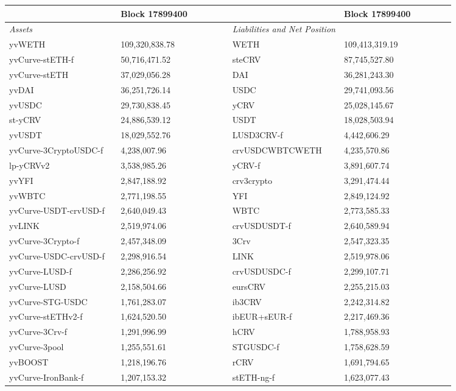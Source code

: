 
\begin{longtable}{@{}p{0.25\linewidth}p{0.25\linewidth}p{0.25\linewidth}p{0.25\linewidth}@{}}

\toprule


& Block 17899400 & & Block 17899400 \\

\midrule
\textit{Assets} & & \textit{Liabilities and Net Position} \\
yvWETH & 109,320,838.78 & WETH &109,413,319.19 \\
yvCurve-stETH-f & 50,716,471.52 & steCRV &87,745,527.80 \\
yvCurve-stETH & 37,029,056.28 & DAI &36,281,243.30 \\
yvDAI & 36,251,726.14 & USDC &29,741,093.56 \\
yvUSDC & 29,730,838.45 & yCRV &25,028,145.67 \\
st-yCRV & 24,886,539.12 & USDT &18,028,503.94 \\
yvUSDT & 18,029,552.76 & LUSD3CRV-f &4,442,606.29 \\
yvCurve-3CryptoUSDC-f & 4,238,007.96 & crvUSDCWBTCWETH &4,235,570.86 \\
lp-yCRVv2 & 3,538,985.26 & yCRV-f &3,891,607.74 \\
yvYFI & 2,847,188.92 & crv3crypto &3,291,474.44 \\
yvWBTC & 2,771,198.55 & YFI &2,849,124.92 \\
yvCurve-USDT-crvUSD-f & 2,640,049.43 & WBTC &2,773,585.33 \\
yvLINK & 2,519,974.06 & crvUSDUSDT-f &2,640,589.94 \\
yvCurve-3Crypto-f & 2,457,348.09 & 3Crv &2,547,323.35 \\
yvCurve-USDC-crvUSD-f & 2,298,916.54 & LINK &2,519,978.06 \\
yvCurve-LUSD-f & 2,286,256.92 & crvUSDUSDC-f &2,299,107.71 \\
yvCurve-LUSD & 2,158,504.66 & eursCRV &2,255,215.03 \\
yvCurve-STG-USDC & 1,761,283.07 & ib3CRV &2,242,314.82 \\
yvCurve-stETHv2-f & 1,624,520.50 & ibEUR+sEUR-f &2,217,469.36 \\
yvCurve-3Crv-f & 1,291,996.99 & hCRV &1,788,958.93 \\
yvCurve-3pool & 1,255,551.61 & STGUSDC-f &1,758,628.59 \\
yvBOOST & 1,218,196.76 & rCRV &1,691,794.65 \\
yvCurve-IronBank-f & 1,207,153.32 & stETH-ng-f &1,623,077.43 \\

\end{longtable}
